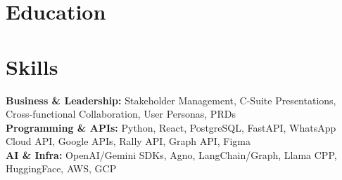\documentclass{../templates/simplecv}
\begin{document}
\section{Education}
\resumeItemListStart
{}
\resumeItemListEnd

\vspace{2pt}

\section{Skills}
\vspace{2pt}
\resumeSubHeadingListStart
\small{\item{
    \textbf{Business \& Leadership:} {Stakeholder Management, C-Suite Presentations, Cross-functional Collaboration, User Personas, PRDs} \\ \vspace{1pt}
    \textbf{Programming \& APIs:} {Python, React, PostgreSQL, FastAPI, WhatsApp Cloud API, Google APIs, Rally API, Graph API, Figma} \\ \vspace{1pt}
    \textbf{AI \& Infra:} {OpenAI/Gemini SDKs, Agno, LangChain/Graph, Llama CPP, HuggingFace, AWS, GCP} \\ \vspace{1pt}
}}
\resumeSubHeadingListEnd
\end{document}
